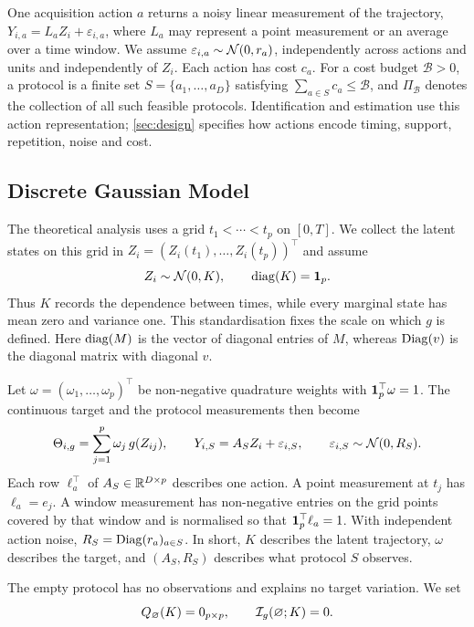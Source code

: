 One acquisition action $a$ returns a noisy linear measurement of the
trajectory,
$Y_{i,a}=L_aZ_i+\varepsilon_{i,a}$, where $L_a$ may represent a point
measurement or an average over a time window. We assume
$\varepsilon_{i,a}\sim\mathcal{N}(0,r_a)$, independently across actions and units and
independently of $Z_i$. Each action has cost $c_a$. For a cost budget
$\mathcal B>0$, a protocol is a finite set $S=\{a_1,\ldots,a_D\}$ satisfying
$\sum_{a\in S}c_a\le\mathcal B$, and $\Pi_{\mathcal B}$ denotes the collection
of all such feasible protocols. Identification and estimation use this action
representation; \cref{sec:design} specifies how actions encode timing, support,
repetition, noise and cost.

\subsection{Discrete Gaussian Model}
\label{sec:discrete}

The theoretical analysis uses a grid $t_1<\cdots<t_p$ on $[0,T]$. We collect
the latent states on this grid in
$Z_i=(Z_i(t_1),\ldots,Z_i(t_p))^\top$ and assume
\begin{equation}
Z_i\sim\mathcal{N}(0,K),\qquad \operatorname{diag}(K)=\mathbf{1}_p.
\label{eq:discrete-model}
\end{equation}
Thus $K$ records the dependence between times, while every marginal state has
mean zero and variance one. This standardisation fixes the scale on which $g$
is defined. Here $\operatorname{diag}(M)$ is the vector of diagonal entries of $M$, whereas
$\operatorname{Diag}(v)$ is the diagonal matrix with diagonal $v$.

Let $\omega=(\omega_1,\ldots,\omega_p)^\top$ be non-negative quadrature weights
with $\mathbf{1}_p^\top\omega=1$. The continuous target and the protocol measurements
then become
\begin{equation}
\Theta_{i,g}=\sum_{j=1}^p\omega_j\,g(Z_{ij}),
\qquad
Y_{i,S}=A_SZ_i+\varepsilon_{i,S},
\qquad
\varepsilon_{i,S}\sim\mathcal{N}(0,R_S).
\label{eq:discrete-protocol}
\end{equation}
Each row $\ell_a^\top$ of $A_S\in\mathbb{R}^{D\times p}$ describes one action. A point
measurement at $t_j$ has $\ell_a=e_j$. A window measurement has non-negative
entries on the grid points covered by that window and is normalised so that
$\mathbf{1}_p^\top\ell_a=1$. With independent action noise,
$R_S=\operatorname{Diag}(r_a)_{a\in S}$. In short, $K$ describes the latent trajectory,
$\omega$ describes the target, and $(A_S,R_S)$ describes what protocol $S$
observes.

The empty protocol has no observations and explains no target variation. We
set
\begin{equation}
Q_\varnothing(K)=0_{p\times p},\qquad \mathcal{I}_g(\varnothing;K)=0.
\label{eq:empty-protocol}
\end{equation}

